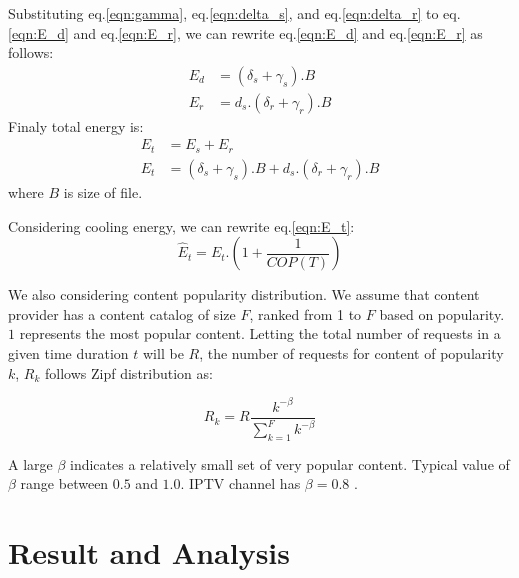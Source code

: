 \documentclass[JIP]{ipsj}
\begin{document}
Substituting eq.\ref{eqn:gamma}, eq.\ref{eqn:delta_s}, and eq.\ref{eqn:delta_r} to eq.\ref{eqn:E_d} and eq.\ref{eqn:E_r}, we can rewrite eq.\ref{eqn:E_d} and eq.\ref{eqn:E_r} as follows:
\begin{equation}\label{eqn:E_d dan E_r}
\begin{split}
	E_{d} &= (\delta_s + \gamma_s).B \\
	E_{r} &= d_s.(\delta_r + \gamma_r).B
\end{split}
\end{equation}
Finaly total energy is:
\begin{equation}\label{eqn:E_t}
\begin{split}
	E_{t} &= E_s + E_r  \\
	E_{t} &= (\delta_s + \gamma_s).B + d_s.(\delta_r + \gamma_r).B
\end{split}
\end{equation}
where $B$ is size of file. 

Considering cooling energy, we can rewrite eq.\ref{eqn:E_t}:
\begin{equation}
	\hat{E}_{t} = E_{t}.\left( 1+\frac{1}{COP(T)} \right)
\end{equation}

We also considering content popularity distribution.   
We assume that content provider has a content catalog of size $F$, ranked from 1 to $F$ based on popularity.   
$1$ represents the most popular content.
Letting the total number of requests in a given time duration $t$ will be $R$, the number of requests for content of popularity $k$, $R_k$ follows Zipf distribution as:

\begin{equation}
	R_k = R \frac{k^{-\beta}}{\sum_{k=1}^F k^{-\beta}}
\end{equation}

A large $\beta$ indicates a relatively small set of very popular content.
Typical value of $\beta$ range between $0.5$ and $1.0$.
IPTV channel has $\beta=0.8$ \cite{Cha:2008:NTP:1855641.1855646}.






\section{Result and Analysis}\label{analysis}
\end{document}
